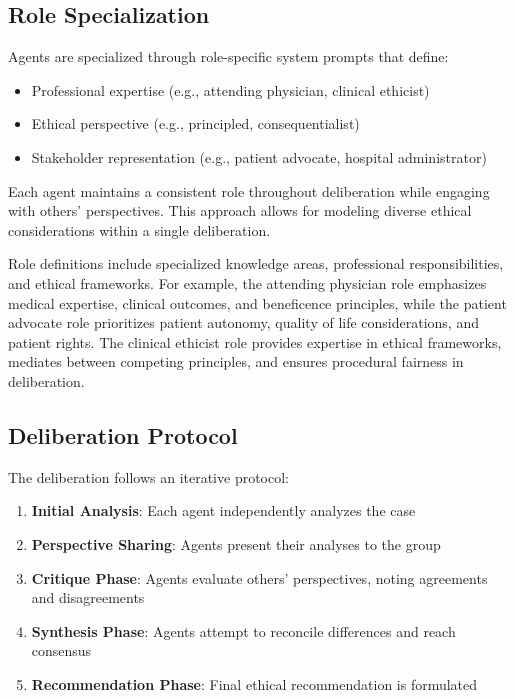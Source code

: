 \documentclass[11pt]{article}
\begin{document}
\subsection{Role Specialization}

Agents are specialized through role-specific system prompts that define:
\begin{itemize}
    \item Professional expertise (e.g., attending physician, clinical ethicist)
    \item Ethical perspective (e.g., principled, consequentialist)
    \item Stakeholder representation (e.g., patient advocate, hospital administrator)
\end{itemize}

Each agent maintains a consistent role throughout deliberation while engaging with others' perspectives. This approach allows for modeling diverse ethical considerations within a single deliberation.

Role definitions include specialized knowledge areas, professional responsibilities, and ethical frameworks. For example, the attending physician role emphasizes medical expertise, clinical outcomes, and beneficence principles, while the patient advocate role prioritizes patient autonomy, quality of life considerations, and patient rights. The clinical ethicist role provides expertise in ethical frameworks, mediates between competing principles, and ensures procedural fairness in deliberation.

\subsection{Deliberation Protocol}

The deliberation follows an iterative protocol:
\begin{enumerate}
    \item \textbf{Initial Analysis}: Each agent independently analyzes the case
    \item \textbf{Perspective Sharing}: Agents present their analyses to the group
    \item \textbf{Critique Phase}: Agents evaluate others' perspectives, noting agreements and disagreements
    \item \textbf{Synthesis Phase}: Agents attempt to reconcile differences and reach consensus
    \item \textbf{Recommendation Phase}: Final ethical recommendation is formulated
\end{enumerate}
\end{document}
